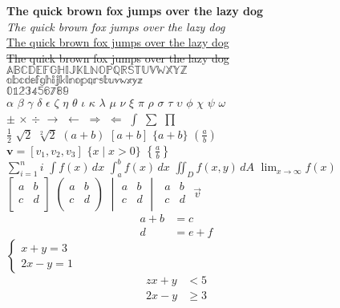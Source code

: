 \documentclass{article}
\begin{document}
\begin{figure}
	\centering
	\textbf{The quick brown fox jumps over the lazy dog} \\
	\textit{The quick brown fox jumps over the lazy dog} \\
	\uline{The quick brown fox jumps over the lazy dog} \\
	\sout{The quick brown fox jumps over the lazy dog} \\
	{\large
	$\mathbb{ABCDEFGHIJKLNOPQRSTUVWXYZ}$ \\
	$\mathbb{abcdefghijklnopqrstuvwxyz}$ \\
	$\mathbb{0123456789}$ \\
	}
	{\Large
	$\alpha$
	$\beta$
	$\gamma$
	$\delta$
	$\epsilon$
	$\zeta$
	$\eta$
	$\theta$
	$\iota$
	$\kappa$
	$\lambda$
	$\mu$
	$\nu$
	$\xi$
	$\pi$
	$\rho$
	$\sigma$
	$\tau$
	$\upsilon$
	$\phi$
	$\chi$
	$\psi$
	$\omega$
	} \\
	{\Large
	$\pm$
	$\times$
	$\div$
	$\rightarrow$
	$\leftarrow$
	$\Rightarrow$
	$\Leftarrow$
	$\int$
	$\sum$
	$\prod$
	} \\
	{\Large
	$\frac{1}{2}$
	$\sqrt{2}$
	$\sqrt[2]{2}$
	$(a + b)$
	$[a + b]$
	$\{a + b\}$
	$\left( \frac{a}{b} \right)$
	} \\
	{\Large
	$\mathbf{v} = [v_1, v_2, v_3]$
	$\{x \mid x > 0\}$
	$\left\{ \frac{a}{b} \right\}$
	} \\
	{\Large
	$\sum_{i=1}^{n} i$
	$\int f(x) \, dx$
	$\int_{a}^{b} f(x) \, dx$
	$\iint_{D} f(x, y) \, dA$
	$\lim_{x \to \infty} f(x)$
	} \\
	{\Large
	$
		\begin{bmatrix}
			a & b \\
			c & d \\
		\end{bmatrix}
	$
	$
		\begin{pmatrix}
			a & b \\
			c & d \\
		\end{pmatrix}
	$
	$
		\begin{vmatrix}
			a & b \\
			c & d \\
		\end{vmatrix}
	$
	$
		\begin{smallmatrix}
			a & b \\
			c & d \\
		\end{smallmatrix}
	$
	$\vec{v}$
	} \\
	{\Large
	\begin{equation}
		\begin{aligned}
			a + b & = c     \\
			d     & = e + f
		\end{aligned}
	\end{equation}
	}
	{\Large
	$
		\begin{cases}
			x + y = 3 \\
			2x - y = 1
		\end{cases}
	$
	\begin{align}
		zx + y & < 5   \\
		2x - y & \geq 3
	\end{align}
	}
\end{figure}
\end{document}
